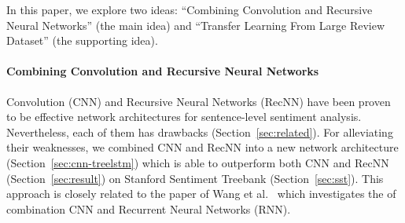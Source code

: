 In this paper, we explore two ideas: ``Combining Convolution and Recursive Neural Networks'' (the main idea) and ``Transfer Learning From Large Review Dataset'' (the supporting idea).
\paragraph{Combining Convolution and Recursive Neural Networks} Convolution (CNN) and Recursive Neural Networks (RecNN) have been proven to be effective network architectures for sentence-level sentiment analysis.
Nevertheless, each of them has drawbacks (Section~\ref{sec:related}).
For alleviating their weaknesses, we combined CNN and RecNN into a new network architecture (Section~\ref{sec:cnn-treelstm}) which is able to outperform both CNN and RecNN (Section~\ref{sec:result}) on Stanford Sentiment Treebank (Section~\ref{sec:sst}).
This approach is closely related to the paper of Wang et al.~\cite{cnn-rnn} which investigates the of combination CNN and Recurrent Neural Networks (RNN).
